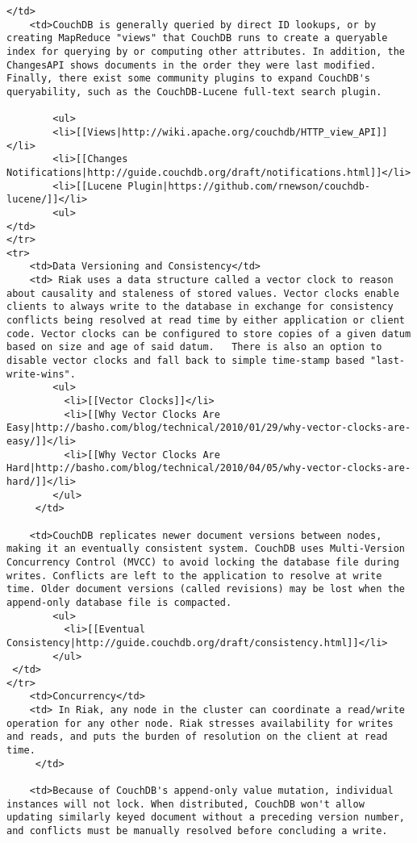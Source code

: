 \documentclass[letter]{book}
\newcounter{tab}[chapter]
\begin{document}
\begin{shaded}
\begin{verbatim}
</td>
    <td>CouchDB is generally queried by direct ID lookups, or by creating MapReduce "views" that CouchDB runs to create a queryable index for querying by or computing other attributes. In addition, the ChangesAPI shows documents in the order they were last modified. Finally, there exist some community plugins to expand CouchDB's queryability, such as the CouchDB-Lucene full-text search plugin.

        <ul>
        <li>[[Views|http://wiki.apache.org/couchdb/HTTP_view_API]]</li>
        <li>[[Changes Notifications|http://guide.couchdb.org/draft/notifications.html]]</li>
        <li>[[Lucene Plugin|https://github.com/rnewson/couchdb-lucene/]]</li>
        <ul>
</td>
</tr>
<tr>
    <td>Data Versioning and Consistency</td>
    <td> Riak uses a data structure called a vector clock to reason about causality and staleness of stored values. Vector clocks enable clients to always write to the database in exchange for consistency conflicts being resolved at read time by either application or client code. Vector clocks can be configured to store copies of a given datum based on size and age of said datum.   There is also an option to disable vector clocks and fall back to simple time-stamp based "last-write-wins".
        <ul>
          <li>[[Vector Clocks]]</li>
          <li>[[Why Vector Clocks Are Easy|http://basho.com/blog/technical/2010/01/29/why-vector-clocks-are-easy/]]</li>
          <li>[[Why Vector Clocks Are Hard|http://basho.com/blog/technical/2010/04/05/why-vector-clocks-are-hard/]]</li>
        </ul>
     </td>

    <td>CouchDB replicates newer document versions between nodes, making it an eventually consistent system. CouchDB uses Multi-Version Concurrency Control (MVCC) to avoid locking the database file during writes. Conflicts are left to the application to resolve at write time. Older document versions (called revisions) may be lost when the append-only database file is compacted.
        <ul>
          <li>[[Eventual Consistency|http://guide.couchdb.org/draft/consistency.html]]</li>
        </ul>
 </td>
</tr>
    <td>Concurrency</td>
    <td> In Riak, any node in the cluster can coordinate a read/write operation for any other node. Riak stresses availability for writes and reads, and puts the burden of resolution on the client at read time.
     </td>

    <td>Because of CouchDB's append-only value mutation, individual instances will not lock. When distributed, CouchDB won't allow updating similarly keyed document without a preceding version number, and conflicts must be manually resolved before concluding a write.


\end{verbatim}
\end{shaded}
\end{document}
